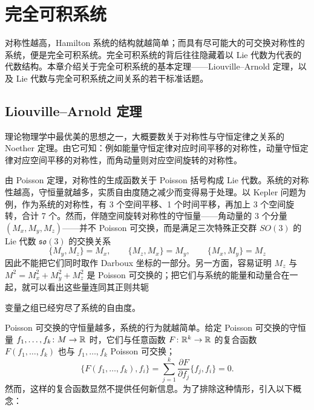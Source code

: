 
\chapter{完全可积系统}

对称性越高，Hamilton 系统的结构就越简单；而具有尽可能大的可交换对称性的系统，便是完全可积系统。完全可积系统的背后往往隐藏着以 Lie 代数为代表的代数结构。本章介绍关于完全可积系统的基本定理——Liouville–Arnold 定理，以及 Lie 代数与完全可积系统之间关系的若干标准话题。

\section{Liouville--Arnold 定理}

理论物理学中最优美的思想之一，大概要数关于对称性与守恒定律之关系的 Noether 定理。由它可知：例如能量守恒定律对应时间平移的对称性，动量守恒定律对应空间平移的对称性，而角动量则对应空间旋转的对称性。

由 Poisson 定理，对称性的生成函数关于 Poisson 括号构成 Lie 代数。系统的对称性越高，守恒量就越多，实质自由度随之减少而变得易于处理。以 Kepler 问题为例，作为系统的对称性，有 3 个空间平移、1 个时间平移，再加上 3 个空间旋转，合计 7 个。然而，伴随空间旋转对称性的守恒量——角动量的 3 个分量 $(M_x,M_y,M_z)$——并不 Poisson 可交换，而是满足三次特殊正交群 $SO(3)$ 的 Lie 代数 $\mathfrak{so}(3)$ 的交换关系
\[
  \{M_y,M_z\}=M_x,\qquad
  \{M_z,M_x\}=M_y,\qquad
  \{M_x,M_y\}=M_z
\]
因此不能把它们同时取作 Darboux 坐标的一部分。另一方面，容易证明 $M_z$ 与 $M^2=M_x^2+M_y^2+M_z^2$ 是 Poisson 可交换的；把它们与系统的能量和动量合在一起，就可以看出这些量连同其正则共轭

变量之组已经穷尽了系统的自由度。


Poisson 可交换的守恒量越多，系统的行为就越简单。给定 Poisson 可交换的守恒量 $f_1,\dots,f_k\colon M\to\mathbb{R}$ 时，它们与任意函数 $F\colon\mathbb{R}^k\to\mathbb{R}$ 的复合函数 $F(f_1,\dots,f_k)$ 也与 $f_1,\dots,f_k$ Poisson 可交换；
\begin{equation}
  \{F(f_1,\dots,f_k),f_i\}
  =\sum_{j=1}^{k}\frac{\partial F}{\partial f_j}\{f_j,f_i\}=0.
  \tag{6.1.1}
\end{equation}
然而，这样的复合函数显然不提供任何新信息。为了排除这种情形，引入以下概念：

